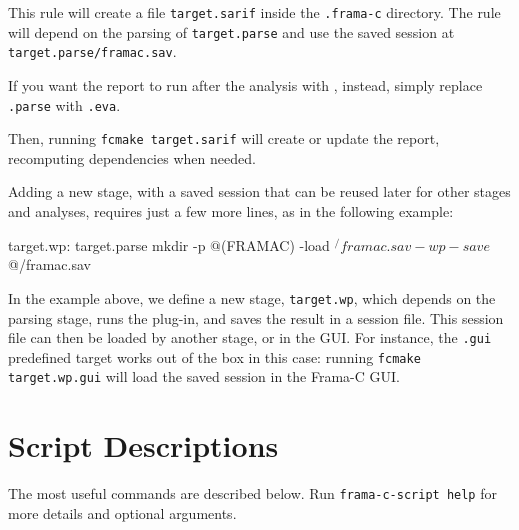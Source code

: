 
This rule will create a file \texttt{target.sarif} inside the \texttt{.frama-c}
directory. The rule will depend on the parsing of \texttt{target.parse} and
use the saved session at \texttt{target.parse/framac.sav}.

If you want the report to run after the analysis with \Value, instead, simply
replace \texttt{.parse} with \texttt{.eva}.

Then, running \texttt{fcmake target.sarif} will create or update the report,
recomputing dependencies when needed.

Adding a new stage, with a saved session that can be reused later for other
stages and analyses, requires just a few more lines, as in the following
example:

\begin{makefilecode}
target.wp: target.parse
	mkdir -p $@
	$(FRAMAC) -load $^/framac.sav -wp -save $@/framac.sav
\end{makefilecode}

In the example above, we define a new stage, \texttt{target.wp}, which depends
on the parsing stage, runs the  plug-in, and saves the result in a
session file. This session file can then be loaded by another stage,
or in the GUI. For instance, the \texttt{.gui} predefined target works out of
the box in this case: running \texttt{fcmake target.wp.gui} will load the saved
session in the Frama-C GUI.

\section{Script Descriptions}
\label{sec:script-descriptions}

The most useful commands are described below.
Run \texttt{frama-c-script help} for more details and optional arguments.

